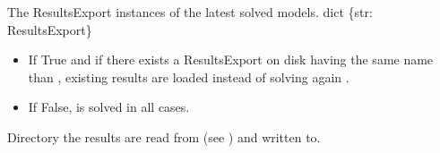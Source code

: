 \documentclass[letterpaper,10pt,english]{sphinxmanual}
\begin{document}
\begin{fulllineitems}
\begin{fulllineitems}
\end{fulllineitems}


\begin{fulllineitems}
\label{\detokenize{generated/tamos.solve_tools.AdvSolve:tamos.solve_tools.AdvSolve.last_binaries}}
\pysigstartsignatures
{}
\pysigstopsignatures
\sphinxAtStartPar
The ResultsExport instances of the latest solved models.
dict \{str: ResultsExport\}

\end{fulllineitems}


\begin{fulllineitems}
\label{\detokenize{generated/tamos.solve_tools.AdvSolve:tamos.solve_tools.AdvSolve.skip_existing}}
\pysigstartsignatures
{}
\pysigstopsignatures\begin{itemize}
\item {} 
\sphinxAtStartPar
If True and if there exists a ResultsExport on disk having the same name than ,
existing results are loaded instead of solving again .

\item {} 
\sphinxAtStartPar
If False,  is solved in all cases.

\end{itemize}

\end{fulllineitems}


\begin{fulllineitems}
\label{\detokenize{generated/tamos.solve_tools.AdvSolve:tamos.solve_tools.AdvSolve.working_dir}}
\pysigstartsignatures
{}
\pysigstopsignatures
\sphinxAtStartPar
Directory the results are read from (see ) and written to.

\end{fulllineitems}


\end{fulllineitems}
\end{document}
